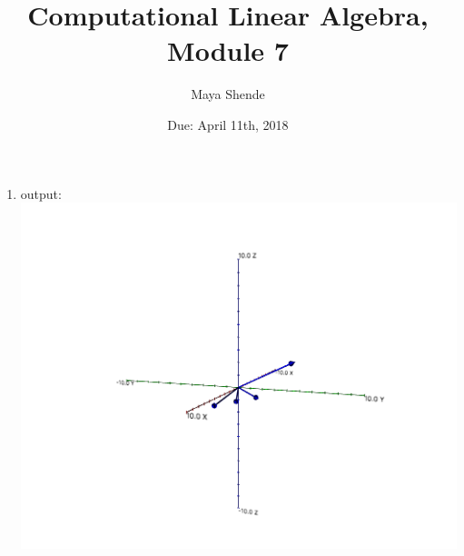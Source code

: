 \documentclass{article}
\title{Computational Linear Algebra, Module 7}
\author{Maya Shende}
\date{Due: April 11th, 2018}
\begin{document}
\maketitle

\begin{enumerate}

\item output:\\
\includegraphics[scale=0.3]{exercise1}


\end{enumerate}
\end{document}
